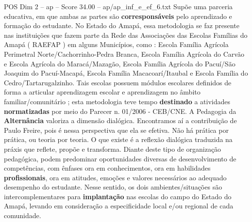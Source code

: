 \begin{textsample}{POS Dim 2 – ap – Score 34.00 – ap/ap\_inf\_e\_ef\_6.txt}
Supõe uma parceria educativa, em que ambas as partes são \textbf{corresponsáveis} pelo aprendizado e formação do estudante.
No Estado do Amapá, essa metodologia se faz presente nas instituições que fazem parte da Rede das Associações das Escolas Famílias do Amapá ( RAEFAP ) em alguns Municípios, como : Escola Família Agrícola Perimetral Norte/Cachorrinho-Pedra Branca, Escola Família Agrícola do Carvão e Escola Agrícola do Maracá/Mazagão, Escola Família Agrícola do Pacuí/São Joaquim do Pacuí-Macapá, Escola Família Macacoarí/Itaubal e Escola Família do Cedro/Tartarugalzinho.
Tais escolas possuem módulos escolares definidos de forma a articular aprendizagem escolar e aprendizagem no âmbito familiar/comunitário ; esta metodologia teve tempo \textbf{destinado} a atividades \textbf{normatizadas} por meio do Parecer n. 01/2006 - CEB/CNE.
A Pedagogia da \textbf{Alternância} valoriza a dimensão dialógica.
Encontramos aí a contribuição de Paulo Freire, pois é nessa perspectiva que ela se efetiva.
Não há prática por prática, ou teoria por teoria.
O que existe é a reflexão dialógica traduzida na práxis que reflete, propõe e transforma.
Diante deste tipo de organização pedagógica, podem predominar oportunidades diversas de desenvolvimento de competências, com ênfases ora em conhecimentos, ora em habilidades \textbf{profissionais}, ora em atitudes, emoções e valores necessários ao adequado desempenho do estudante.
Nesse sentido, os dois ambientes/situações são intercomplementares para \textbf{implantação} nas escolas do campo do Estado do Amapá, levando em consideração a especificidade local e/ou regional de cada comunidade.

\end{textsample}

